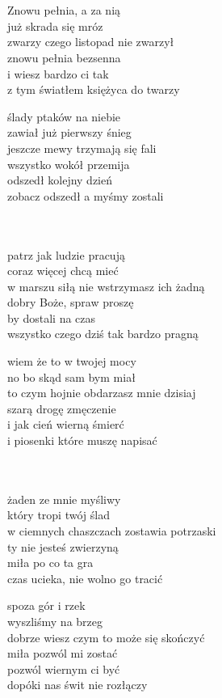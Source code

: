 \begin{text}
    ~\\
    ~\\
    Znowu pełnia, a za nią\\
    już skrada się mróz\\
    zwarzy czego listopad nie zwarzył\\
    znowu pełnia bezsenna\\
    i wiesz bardzo ci tak\\
    z tym światłem księżyca do twarzy

    \vin ślady ptaków na niebie\\
    \vin zawiał już pierwszy śnieg\\
    \vin jeszcze mewy trzymają się fali\\
    \vin wszystko wokół przemija\\
    \vin odszedł kolejny dzień\\
    \vin zobacz odszedł a myśmy zostali\\
    ~\\
    ~

    patrz jak ludzie pracują\\
    coraz więcej chcą mieć\\
    w marszu siłą nie wstrzymasz ich żadną\\
    dobry Boże, spraw proszę\\
    by dostali na czas\\
    wszystko czego dziś tak bardzo pragną

    \vin wiem że to w twojej mocy\\
    \vin no bo skąd sam bym miał\\
    \vin to czym hojnie obdarzasz mnie dzisiaj\\
    \vin szarą drogę zmęczenie\\
    \vin i jak cień wierną śmierć\\
    \vin i piosenki które muszę napisać\\
    ~\\
    ~

    żaden ze mnie myśliwy\\
    który tropi twój ślad\\
    w ciemnych chaszczach zostawia potrzaski\\
    ty nie jesteś zwierzyną\\
    miła po co ta gra\\
    czas ucieka, nie wolno go tracić

    \vin spoza gór i rzek\\
    \vin wyszliśmy na brzeg\\
    \vin dobrze wiesz czym to może się skończyć\\
    \vin miła pozwól mi zostać\\
    \vin pozwól wiernym ci być\\
    \vin dopóki nas świt nie rozłączy\\
    ~\\
    ~
\end{text}
